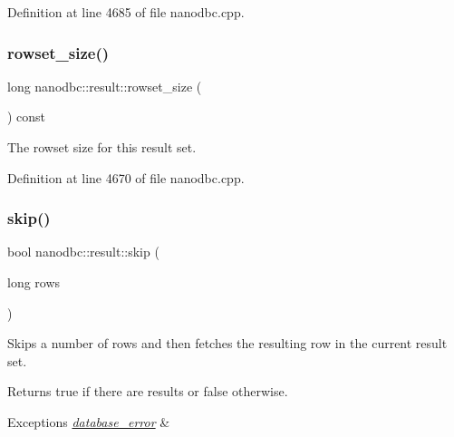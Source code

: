 Definition at line 4685 of file nanodbc.\+cpp.

\mbox{\label{classnanodbc_1_1result_adea873810ff2e393096c16aabeadd48f}} 
\subsubsection{\texorpdfstring{rowset\_size()}{rowset\_size()}}
{\footnotesize\ttfamily long nanodbc\+::result\+::rowset\+\_\+size (\begin{DoxyParamCaption}{ }\end{DoxyParamCaption}) const\hspace{0.3cm}{\ttfamily [noexcept]}}



The rowset size for this result set. 



Definition at line 4670 of file nanodbc.\+cpp.

\mbox{\label{classnanodbc_1_1result_abcd96eb3fd8fea53fa41289c5fc87377}} 
\subsubsection{\texorpdfstring{skip()}{skip()}}
{\footnotesize\ttfamily bool nanodbc\+::result\+::skip (\begin{DoxyParamCaption}\item[{long}]{rows }\end{DoxyParamCaption})}



Skips a number of rows and then fetches the resulting row in the current result set. 

\begin{DoxyReturn}{Returns}
true if there are results or false otherwise. 
\end{DoxyReturn}

\begin{DoxyExceptions}{Exceptions}
{\em \mbox{\hyperlink{classnanodbc_1_1database__error}{database\+\_\+error}}} & \\
\hline
\end{DoxyExceptions}


